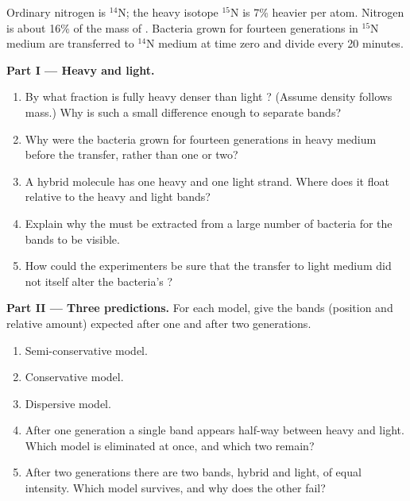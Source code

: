 \begin{problem}
\label{pb:g11:dna-replication:1}
Ordinary nitrogen is $^{14}$N; the heavy isotope $^{15}$N is 7\%
heavier per atom. Nitrogen is about 16\% of the mass of . Bacteria
grown for fourteen generations in $^{15}$N medium are transferred to
$^{14}$N medium at time zero and divide every 20 minutes.

\medskip
\noindent\textbf{Part I --- Heavy and light.}
\begin{enumerate}
  \item By what fraction is fully heavy  denser than light ?
        (Assume density follows mass.) Why is such a small difference
        enough to separate bands?
  \item Why were the bacteria grown for fourteen generations in heavy
        medium before the transfer, rather than one or two?
  \item A hybrid molecule has one heavy and one light strand. Where
        does it float relative to the heavy and light bands?
  \item Explain why the  must be extracted from a large number of
        bacteria for the bands to be visible.
  \item How could the experimenters be sure that the transfer to light
        medium did not itself alter the bacteria's ?
\end{enumerate}

\medskip
\noindent\textbf{Part II --- Three predictions.}
For each model, give the bands (position and relative amount)
expected after one and after two generations.
\begin{enumerate}[resume]
  \item Semi-conservative model.
  \item Conservative model.
  \item Dispersive model.
  \item After one generation a single band appears half-way between
        heavy and light. Which model is eliminated at once, and which
        two remain?
  \item After two generations there are two bands, hybrid and light,
        of equal intensity. Which model survives, and why does the
        other fail?
\end{enumerate}


\end{problem}

